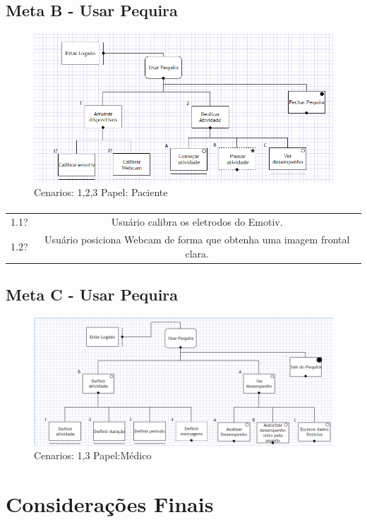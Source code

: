 \documentclass[12pt]{article}
\begin{document}
\subsection{Meta B - Usar Pequira}

\begin{figure}[h]
\centering
\includegraphics[scale=0.7]{MetaC.png}
\caption{Cenarios: 1,2,3 \quad Papel: Paciente}
\end{figure}
\paragraph{}
\begin{tabular}{lc}
1.1? & Usuário calibra os eletrodos do Emotiv. \\
1.2? & Usuário posiciona Webcam de forma que obtenha uma imagem frontal clara.
\end{tabular}
\newpage
\subsection{Meta C - Usar Pequira}

\begin{figure}[h]
\centering
\includegraphics[scale=0.6]{MetaD.png}
\caption{Cenarios: 1,3 \quad Papel:Médico}
\end{figure}
\section{Considerações Finais}
\end{document}

